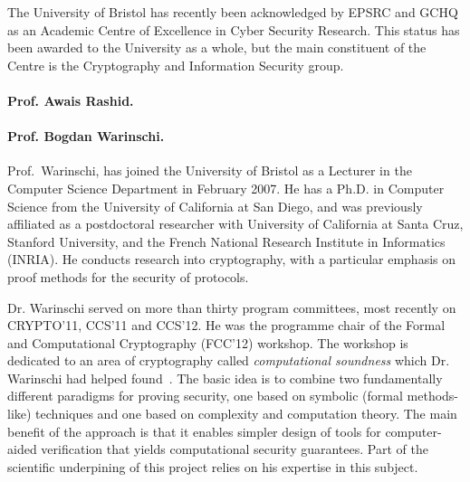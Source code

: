 \documentclass[10pt]{article}
\begin{document}
The University of Bristol has recently been acknowledged by 
EPSRC and GCHQ as an Academic Centre of Excellence in Cyber Security
Research. This status has been awarded to the University as a whole,
but the main constituent of the Centre is the Cryptography and Information
Security group.
\fi



\paragraph{Prof. Awais Rashid.}

\vspace{.5cm}


\paragraph{Prof. Bogdan Warinschi.}
Prof.~Warinschi, has joined the University of 
Bristol as a Lecturer in the Computer Science Department in February 2007. 
He has a Ph.D. in Computer Science from the University of California
at San Diego, and was previously affiliated as a postdoctoral researcher with
University of California at Santa Cruz, Stanford University, and the
French National Research Institute in Informatics (INRIA).
He conducts research into cryptography, with a particular emphasis on
proof methods for the security of protocols.


\iffalse
He was a co-investigator on the EP/H043454/1 EPSRC grant on "Privacy and Attestation Technologies" and on the ERC Advanced Grant ERC-2010-AdG-267188-CRIPTO on "Cryptography Research Involving Practical and Theoretical Outlooks". 
He is a co-PI on the FP 7 project ``PRACTICE" (grant agreement 609611).
\fi
Dr. Warinschi served on more than thirty program committees, most recently on CRYPTO'11, CCS'11 and CCS'12. 
He was the programme chair of the Formal and Computational Cryptography (FCC'12) workshop. 
The workshop is dedicated to an area of cryptography called {\em computational   soundness} which Dr. Warinschi had helped found~\cite{micciancio04completeness,micciancio04soundness,cortier05computationally,abadi05security,abadi05passwordbased,abadi06guessing,datta06computationally,cortier06computationally}.
The basic idea is to combine two fundamentally different paradigms for proving security, one based on symbolic (formal methods-like) techniques and one based on complexity and computation theory. The main benefit of the approach is that it enables simpler design of tools for computer-aided verification that yields computational security guarantees.
Part of the scientific underpining of this project relies on his expertise in this subject. 
\end{document}
